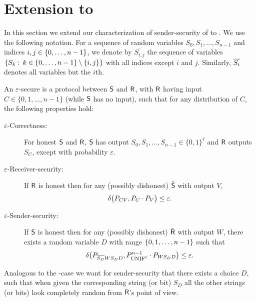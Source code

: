 \section{Extension to \onenlStringOT}
In this section we extend our characterization of sender-security of
\RandOT to \onenRandOT.  We use the following notation. For a sequence
of random variables $S_0,S_1,\ldots,S_{n-1}$ and indices $i,j \in
\set{0,\ldots,n-1}$, we denote by $\overline{S_{i,j}}$ the sequence of
variables $\Set{S_k}{k \in \set{0,\ldots,n-1} \setminus \set{i,j}}$
with all indices except $i$ and $j$. Similarly, $\ol{S_i}$ denotes all
variables but the $i$th.

\begin{definition}[\onenRandlStringOT]\label{def:onenROT}
An $\varepsilon$-secure {\em \onenRandOT} is a protocol between $\S$ and $\R$, with $\R$ having
input $C \in \{0,1,\ldots,n-1\}$  (while $\S$ has no input), such that
for any distribution of $C$, the following properties hold:
\begin{description}
\item[\boldmath$\varepsilon$-Correctness:] For honest $\S$ and $\R$, $\S$
  has output $S_0,S_1,\ldots,S_{n-1} \in \{0,1\}^{\ell}$ and $\R$ outputs
  $S_C$, except with probability $\varepsilon$.
\item[\boldmath$\varepsilon$-Receiver-security:] If $\R$ is honest then for any
  (possibly dishonest) $\dS$ with output $V$,
\[ \dist{ P_{CV} , P_C \cdot P_V } \leq \eps . 
\] 
\item[\boldmath$\varepsilon$-Sender-security:] If $\S$ is honest then for any
  (possibly dishonest) $\dR$ with output $W$, there exists a random
  variable $D$ with range $\set{0,1,\ldots,n-1}$ such that
\[ \dist{ P_{\ol{S_D} W S_D D} , P_{\unif^{\ell}}^{n-1} \cdot P_{W S_D
  D} } \leq \eps.
\] 
\end{description}
\end{definition}
Analogous to the \OT-case we want for sender-security that there exists
a choice $D$, such that when given the corresponding string (or bit) $S_D$ all the
other strings (or bits) look completely random from $\R$'s point of view. 

